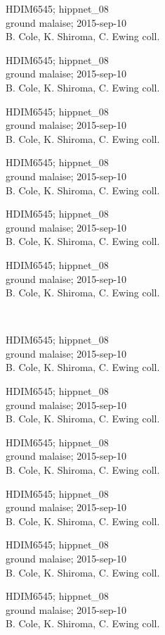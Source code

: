 \documentclass[2pt]{extarticle}
\begin{document}
\noindent
\parbox{0.16\textwidth}{\tiny \raggedright \rule[-0.3\baselineskip]{0pt}{10pt}HDIM6545; hippnet\_08\\ ground malaise; 2015-sep-10\\ B. Cole, K. Shiroma, C. Ewing coll.}
\parbox{0.16\textwidth}{\tiny \raggedright \rule[-0.3\baselineskip]{0pt}{10pt}HDIM6545; hippnet\_08\\ ground malaise; 2015-sep-10\\ B. Cole, K. Shiroma, C. Ewing coll.}
\parbox{0.16\textwidth}{\tiny \raggedright \rule[-0.3\baselineskip]{0pt}{10pt}HDIM6545; hippnet\_08\\ ground malaise; 2015-sep-10\\ B. Cole, K. Shiroma, C. Ewing coll.}
\parbox{0.16\textwidth}{\tiny \raggedright \rule[-0.3\baselineskip]{0pt}{10pt}HDIM6545; hippnet\_08\\ ground malaise; 2015-sep-10\\ B. Cole, K. Shiroma, C. Ewing coll.}
\parbox{0.16\textwidth}{\tiny \raggedright \rule[-0.3\baselineskip]{0pt}{10pt}HDIM6545; hippnet\_08\\ ground malaise; 2015-sep-10\\ B. Cole, K. Shiroma, C. Ewing coll.}
\parbox{0.16\textwidth}{\tiny \raggedright \rule[-0.3\baselineskip]{0pt}{10pt}HDIM6545; hippnet\_08\\ ground malaise; 2015-sep-10\\ B. Cole, K. Shiroma, C. Ewing coll.} \\ 
\vspace{0.001in} 

\noindent
\parbox{0.16\textwidth}{\tiny \raggedright \rule[-0.3\baselineskip]{0pt}{10pt}HDIM6545; hippnet\_08\\ ground malaise; 2015-sep-10\\ B. Cole, K. Shiroma, C. Ewing coll.}
\parbox{0.16\textwidth}{\tiny \raggedright \rule[-0.3\baselineskip]{0pt}{10pt}HDIM6545; hippnet\_08\\ ground malaise; 2015-sep-10\\ B. Cole, K. Shiroma, C. Ewing coll.}
\parbox{0.16\textwidth}{\tiny \raggedright \rule[-0.3\baselineskip]{0pt}{10pt}HDIM6545; hippnet\_08\\ ground malaise; 2015-sep-10\\ B. Cole, K. Shiroma, C. Ewing coll.}
\parbox{0.16\textwidth}{\tiny \raggedright \rule[-0.3\baselineskip]{0pt}{10pt}HDIM6545; hippnet\_08\\ ground malaise; 2015-sep-10\\ B. Cole, K. Shiroma, C. Ewing coll.}
\parbox{0.16\textwidth}{\tiny \raggedright \rule[-0.3\baselineskip]{0pt}{10pt}HDIM6545; hippnet\_08\\ ground malaise; 2015-sep-10\\ B. Cole, K. Shiroma, C. Ewing coll.}
\parbox{0.16\textwidth}{\tiny \raggedright \rule[-0.3\baselineskip]{0pt}{10pt}HDIM6545; hippnet\_08\\ ground malaise; 2015-sep-10\\ B. Cole, K. Shiroma, C. Ewing coll.} \\ 
\vspace{0.001in} 
\end{document}
